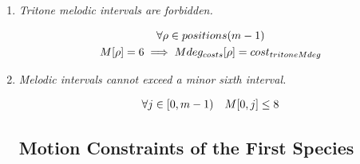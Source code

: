 \begin{enumerate}[wide, label=\bfseries 1.M\arabic*]
\item\label{rule:notritone}{\textit{Tritone melodic intervals are forbidden.} }

\begin{equation}
    \begin{gathered}
        \forall \rho \in positions(m-1)\\
        M[\rho] = 6 \implies Mdeg_{costs}[\rho] = cost_{tritoneMdeg}\\
    \end{gathered}
\end{equation}

\item\label{rule:mlesixth}{\textit{Melodic intervals cannot exceed a minor sixth interval.}}

\begin{equation}
    \begin{gathered}
        \forall j \in [0, m-1)\quad
        M[0, j] \leq 8
    \end{gathered}
\end{equation}

\subsection*{Motion Constraints of the First Species}
\end{enumerate}
